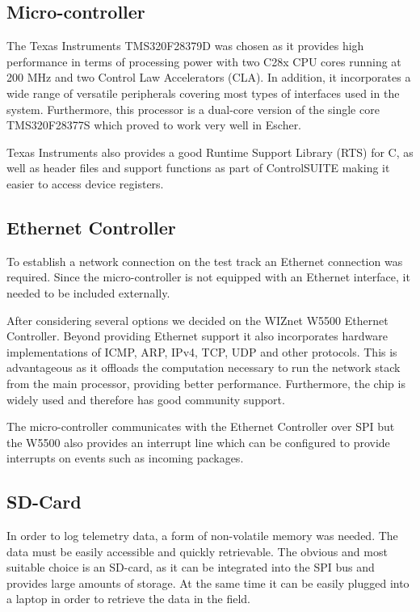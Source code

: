 \subsection{Micro-controller}

The Texas Instruments TMS320F28379D\cite{mcu} was chosen as it provides high performance in terms of processing power with two C28x CPU cores running at 200 MHz and two Control Law Accelerators (CLA). In addition, it incorporates a wide range of versatile peripherals covering most types of interfaces used in the system. Furthermore, this processor is a dual-core version of the single core TMS320F28377S which proved to work very well in Escher.

Texas Instruments also provides a good Runtime Support Library (RTS) for C, as well as header files and support functions as part of ControlSUITE\cite{controlsuite} making it easier to access device registers.

\subsection{Ethernet Controller}

To establish a network connection on the test track an Ethernet connection was required. Since the micro-controller is not equipped with an Ethernet interface, it needed to be included externally.

After considering several options we decided on the WIZnet W5500 Ethernet Controller\cite{wiznet}. Beyond providing Ethernet support it also incorporates hardware implementations of ICMP, ARP, IPv4, TCP, UDP and other protocols. This is advantageous as it offloads the computation necessary to run the network stack from the main processor, providing better performance. Furthermore, the chip is widely used and therefore has good community support.

The micro-controller communicates with the Ethernet Controller over SPI but the W5500 also provides an interrupt line which can be configured to provide interrupts on events such as incoming packages.

\subsection{SD-Card}

In order to log telemetry data, a form of non-volatile memory was needed. The data must be easily accessible and quickly retrievable. The obvious and most suitable choice is an SD-card, as it can be integrated into the SPI bus and provides large amounts of storage. At the same time it can be easily plugged into a laptop in order to retrieve the data in the field.

